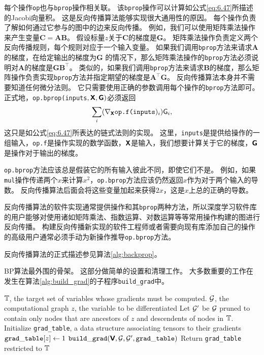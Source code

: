 每个操作\verb|op|也与\verb|bprop|操作相关联。
该\verb|bprop|操作可以计算如公式\ref{eq:6.47}所描述的Jacobi向量积。
这是反向传播算法能够实现很大通用性的原因。
每个操作负责了解如何通过它参与的图中的边来反向传播。
例如，我们可以使用矩阵乘法操作来产生变量$\bm{C}=\bm{A}\bm{B}$。
假设标量$z$关于$\bm{C}$的梯度是$\bm{G}$。
矩阵乘法操作负责定义两个反向传播规则，每个规则对应于一个输入变量。
如果我们调用\verb|bprop|方法来请求$\bm{A}$的梯度，在给定输出的梯度为$\bm{G}$ 的情况下，那么矩阵乘法操作的\verb|bprop|方法必须说明对$\bm{A}$的梯度是$\bm{G}\bm{B}^\top$。
类似的，如果我们调用\verb|bprop|方法来请求$\bm{B}$的梯度，那么矩阵操作负责实现\verb|bprop|方法并指定期望的梯度是$\bm{A}^\top\bm{G}$。
反向传播算法本身并不需要知道任何微分法则。
它只需要使用正确的参数调用每个操作的\verb|bprop|方法即可。
正式地，\verb|op.bprop(inputs|$, \textsf{\textbf{X}}, \textsf{\textbf{G}})$必须返回
\begin{equation}
  \sum_i (\nabla_{\TSX} \verb|op.f(inputs|)_i) \textsf{G}_i,
\end{equation}
这只是如公式\ref{eq:6.47}所表达的链式法则的实现。
这里，\verb|inputs|是提供给操作的一组输入，\verb|op.f|是操作实现的数学函数，$\textsf{\textbf{X}}$是输入，我们想要计算关于它的梯度，$\textsf{\textbf{G}}$是操作对于输出的梯度。

\verb|op.bprop|方法应该总是假装它的所有输入彼此不同，即使它们不是。
例如，如果\verb|mul|操作传递两个$x$来计算$x^2$，\verb|op.bprop|方法应该仍然返回$x$作为对于两个输入的导数。
反向传播算法后面会将这些变量加起来获得$2x$，这是$x$上总的正确的导数。

反向传播算法的软件实现通常提供操作和其\verb|bprop|两种方法，所以深度学习软件库的用户能够对使用诸如矩阵乘法、指数运算、对数运算等等常用操作构建的图进行反向传播。
构建反向传播新实现的软件工程师或者需要向现有库添加自己的操作的高级用户通常必须手动为新操作推导\verb|op.bprop|方法。

反向传播算法的正式描述参见算法\ref{alg:backprop}。

\begin{algorithm}[ht]
\caption{\gls{BP}算法最外围的骨架。
这部分做简单的设置和清理工作。
大多数重要的工作在发生在算法\ref{alg:build_grad}的子程序{\tt build\_grad}中。
}
\label{alg:backprop}
\begin{algorithmic}
\REQUIRE $\mathbb{T}$, the target set of variables whose gradients must be computed.
\REQUIRE $\mathcal{G}$, the computational graph
\REQUIRE $z$, the variable to be differentiated
\STATE Let $\mathcal{G}'$ be $\mathcal{G}$ pruned to contain only nodes that are ancestors
of $z$ and descendents of nodes in $\mathbb{T}$.
\STATE Initialize {\tt grad\_table}, a data structure associating tensors
to their gradients
\STATE ${\tt grad\_table}[z] \leftarrow 1$
\STATE ${\tt build\_grad}(\textsf{\textbf{V}}, \mathcal{G}, \mathcal{G}', {\tt grad\_table})$
\ENDFOR
\STATE Return {\tt grad\_table} restricted to $\mathbb{T}$
\end{algorithmic}
\end{algorithm}

